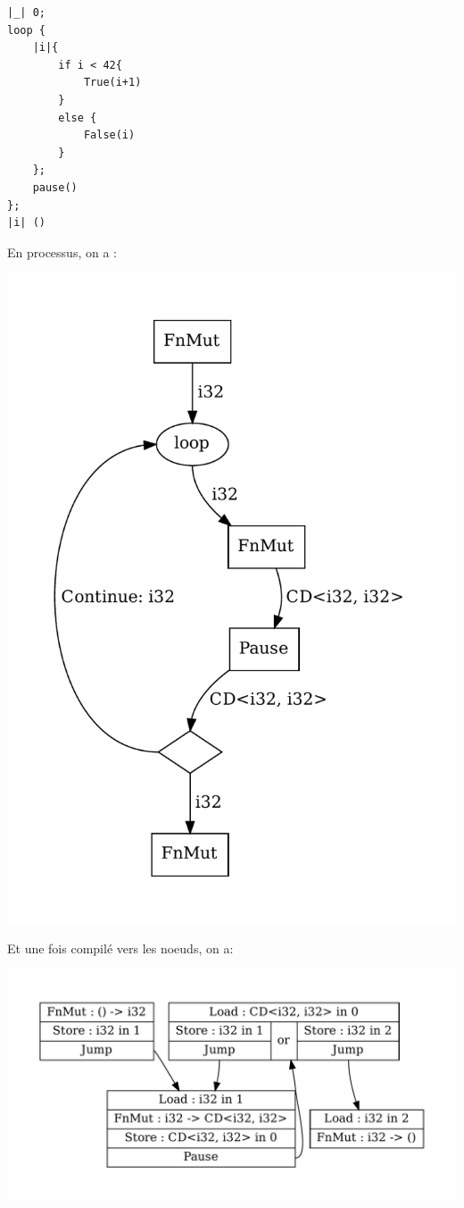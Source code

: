 \documentclass[a4paper]{article}
\renewcommand{\(}{\left(}
\renewcommand{\)}{\right)}
\begin{document}
\begin{verbatim}
|_| 0;
loop {
    |i|{
        if i < 42{
            True(i+1)
        }
        else {
            False(i)
        }
    };
    pause()
};
|i| ()
\end{verbatim}
\pagebreak
En processus, on a :
\begin{center}
\includegraphics[scale=0.72]{loopp.pdf}
\end{center}

Et une fois compilé vers les noeuds, on a:
\begin{center}
\includegraphics[scale=0.72]{loopn.pdf}
\end{center}
\end{document}
